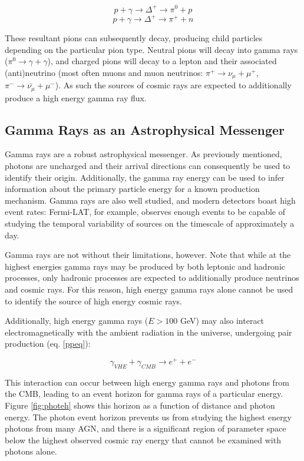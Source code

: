 \begin{equation}
    p + \gamma \rightarrow \Delta^+ \rightarrow \pi^0 + p
\label{hadeq2}    
\end{equation}
\begin{equation}
    p + \gamma \rightarrow \Delta^+ \rightarrow \pi^+ + n
\label{hadeq3}    
\end{equation}

These resultant pions can subsequently decay, producing child particles depending on the particular pion type. Neutral pions will decay into gamma rays ($\pi^0 \rightarrow \gamma + \gamma$), and charged pions will decay to a lepton and their associated (anti)neutrino (most often muons and muon neutrinos: $\pi^+ \rightarrow \nu_{\mu} + \mu^+$, $\pi^- \rightarrow \bar{\nu_{\mu}} + \mu^-$). As such the sources of cosmic rays are expected to additionally produce a high energy gamma ray flux.

\subsection{Gamma Rays as an Astrophysical Messenger}
Gamma rays are a robust astrophysical messenger. As previously mentioned, photons are uncharged and their arrival directions can consequently be used to identify their origin. Additionally, the gamma ray energy can be used to infer information about the primary particle energy for a known production mechanism. Gamma rays are also well studied, and modern detectors boast high event rates: Fermi-LAT, for example, observes enough events to be capable of studying the temporal variability of sources on the timescale of approximately a day. 

Gamma rays are not without their limitations, however. Note that while at the highest energies gamma rays may be produced by both leptonic and hadronic processes, only hadronic processes are expected to additionally produce neutrinos and cosmic rays. For this reason, high energy gamma rays alone cannot be used to identify the source of high energy cosmic rays. 

Additionally, high energy gamma rays ($E>100$ GeV) may also interact electromagnetically with the ambient radiation in the universe, undergoing pair production (eq. \ref{ppeq}):

\begin{equation}
    \gamma_{VHE} + \gamma_{CMB} \rightarrow e^+ + e^-
\label{ppeq}
\end{equation}

This interaction can occur between high energy gamma rays and photons from the CMB, leading to an event horizon for gamma rays of a particular energy. Figure \ref{fig:photeh} shows this horizon as a function of distance and photon energy. The photon event horizon prevents us from studying the highest energy photons from many AGN, and there is a significant region of parameter space below the highest observed cosmic ray energy that cannot be examined with photons alone. 

